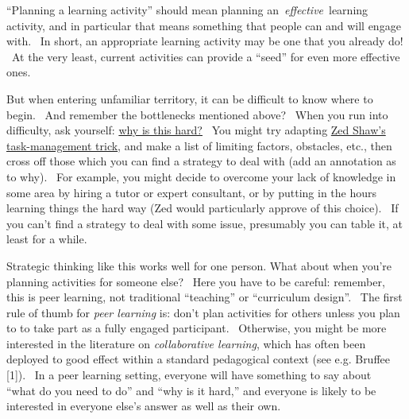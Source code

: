 ``Planning a learning activity'' should mean planning
an~\emph{effective}~learning activity, and in particular that means
something that people can and will engage with. ~In short, an
appropriate learning activity may be one that you already do! ~At the
very least, current activities can provide a ``seed'' for even more
effective ones.

But when entering unfamiliar territory, it can be difficult to know
where to begin.~ And remember the bottlenecks mentioned above?~ When you
run into difficulty, ask yourself:
\href{http://peeragogy.org/patterns-and-heuristics/}{why is this hard?}~
You might try adapting
\href{http://learnpythonthehardway.org/book/intro.html\#comment-409972596}{Zed
Shaw's task-management trick}, and make a list of limiting factors,
obstacles, etc., then cross off those which you can find a strategy to
deal with (add an annotation as to why). ~For example, you might decide
to overcome your lack of knowledge in some area by hiring a tutor or
expert consultant, or by putting in the hours learning things the hard
way (Zed would particularly approve of this choice).~ If you can't find
a strategy to deal with some issue, presumably you can table it, at
least for a while.

Strategic thinking like this works well for one person. What about
when you're planning activities for someone else? ~Here you have to be
careful: remember, this is peer learning, not traditional ``teaching''
or ``curriculum design''. ~The first rule of thumb for \emph{peer
learning} is: don't plan activities for others unless you plan to to
take part as a fully engaged participant.~ Otherwise, you might be
more interested in the literature on \emph{collaborative learning},
which has often been deployed to good effect within a standard
pedagogical context (see e.g. Bruffee {[}1{]}).~ In a peer learning
setting, everyone will have something to say about~ ``what do you need
to do'' and ``why is it hard,'' and everyone is likely to be
interested in everyone else's answer as well as their own.


